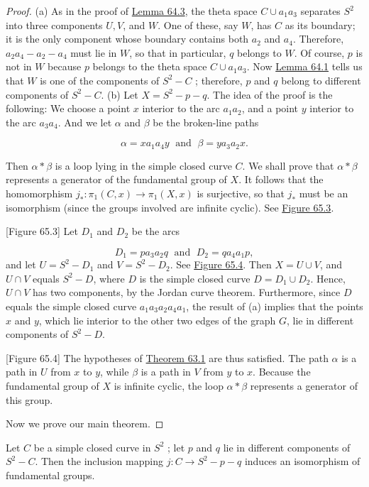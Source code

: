 \begin{proof}
(a) As in the proof of \hyperref[lem:64.3]{Lemma 64.3}, the theta space \(C \cup {a}_{1}a_{3}\) separates \(S^{2}\) into three components \(U,V\), and \(W\). One of these, say \(W\), has \(C\) as its boundary; it is the only component whose boundary contains both \(a_{2}\) and \(a_{4}\). Therefore, \(a_{2}a_{4} - a_{2} - a_{4}\) must lie in \(W\), so that in particular, \(q\) belongs to \(W\). Of course, \(p\) is not in \(W\) because \(p\) belongs to the theta space \(C \cup {a}_{1}a_{3}\). Now \hyperref[lem:64.1]{Lemma 64.1} tells us that \(W\) is one of the components of \(S^{2} - C\) ; therefore, \(p\) and \(q\) belong to different components of \(S^{2} - C\).
(b) Let \(X = S^{2} - p - q\). The idea of the proof is the following: We choose a point \(x\) interior to the arc \(a_{1}a_{2}\), and a point \(y\) interior to the arc \(a_{3}a_{4}\). And we let \(\alpha\) and \(\beta\) be the broken-line paths

\[
\alpha = xa_{1}a_{4}y\;\text{ and }\;\beta = ya_{3}a_{2}x.
\]

Then \(\alpha * \beta\) is a loop lying in the simple closed curve \(C\). We shall prove that \(\alpha * \beta\) represents a generator of the fundamental group of \(X\). It follows that the homomorphism \(j_{ * } : {\pi }_{1}( {C,x}) \rightarrow {\pi }_{1}( {X,x})\) is surjective, so that \(j_{ * }\) must be an isomorphism (since the groups involved are infinite cyclic). See \hyperref[fig:65.3]{Figure 65.3}.

[Figure 65.3]
Let \(D_{1}\) and \(D_{2}\) be the arcs

\[
D_{1} = pa_{3}a_{2}q\;\text{ and }\;D_{2} = qa_{4}a_{1}p,
\]
and let \(U = S^{2} - D_{1}\) and \(V = S^{2} - D_{2}\). See \hyperref[fig:65.4]{Figure 65.4}. Then \(X = U \cup V\), and \(U \cap V\) equals \(S^{2} - D\), where \(D\) is the simple closed curve \(D = D_{1} \cup {D}_{2}\). Hence, \(U \cap V\) has two components, by the Jordan curve theorem. Furthermore, since \(D\) equals the simple closed curve \(a_{1}a_{3}a_{2}a_{4}a_{1}\), the result of (a) implies that the points \(x\) and \(y\), which lie interior to the other two edges of the graph \(G\), lie in different components of \(S^{2} - D\).

[Figure 65.4]
The hypotheses of \hyperref[thm:63.1]{Theorem 63.1} are thus satisfied. The path \(\alpha\) is a path in \(U\) from \(x\) to \(y\), while \(\beta\) is a path in \(V\) from \(y\) to \(x\). Because the fundamental group of \(X\) is infinite cyclic, the loop \(\alpha * \beta\) represents a generator of this group.

Now we prove our main theorem.
\end{proof}
\begin{theorem}
\label{thm:\thetheorem}
Let \(C\) be a simple closed curve in \(S^{2}\) ; let \(p\) and \(q\) lie in different components of \(S^{2} - C\). Then the inclusion mapping \(j : C \rightarrow {S}^{2} - p - q\) induces an isomorphism of fundamental groups.
\end{theorem}

